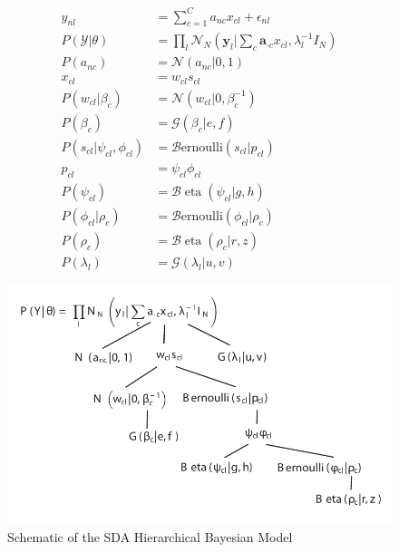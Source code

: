 \begin{equation}
\begin{aligned}
y_{n l} &= \sum_{c=1}^{C} a_{n c} x_{c l}+\epsilon_{n l} \\
P(\mathcal{Y} | \theta) &=\prod_{l} \mathcal{N}_{N}\left(\mathbf{y}_{l} | \sum_{c} \mathbf{a}_{\cdot c} x_{c l}, \lambda_{l}^{-1} I_{N}\right) \\ 
P\left(a_{n c}\right) &=\mathcal{N}\left(a_{n c} | 0,1\right) \\
x_{c l} &= w_{c l} s_{c l} \\
P\left(w_{c l} | \beta_{c}\right) &=\mathcal{N}\left(w_{c l} | 0, \beta_{c}^{-1}\right) \\
P\left(\beta_{c}\right) &=\mathcal{G}\left(\beta_{c} | e, f\right) \\ 
P\left(s_{c l} | \psi_{c l}, \phi_{c l}\right) &=\mathcal{B} \text{ernoulli}\left(s_{c l} | p_{c l}\right) \\ 
p_{c l} &= \psi_{c l} \phi_{c l} \\
P\left(\psi_{c l}\right) &=\mathcal{B} \operatorname{eta}\left(\psi_{c l} | g, h\right) \\
P\left(\phi_{c l} | \rho_{c}\right) &=\mathcal{B} \text{ernoulli}\left(\phi_{c l} | \rho_{c}\right) \\
P\left(\rho_{c}\right) &=\mathcal{B} \operatorname{eta}\left(\rho_{c} | r, z\right) \\
P\left(\lambda_{l}\right) &=\mathcal{G}\left(\lambda_{l} | u, v\right) 
\label{eq:SDA}
\end{aligned}
\end{equation}

\begin{figure}[H]
	\centering
	\includegraphics[width=\textwidth]{figures/intro/SDA.pdf}
	\caption[SDA Model]{Schematic of the SDA Hierarchical Bayesian Model}
	\label{fig:SDAmodel}
\end{figure}

